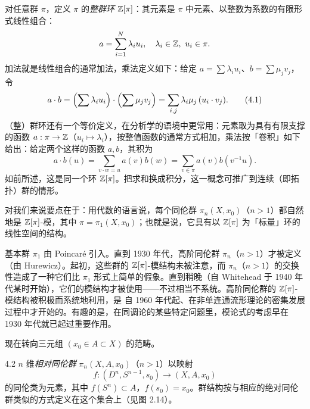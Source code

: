 对任意群 $\pi$，定义 $\pi$ 的\emph{整群环} $\mathbb{Z}[\pi]$：其元素是 $\pi$ 中元素、以整数为系数的有限形式线性组合：
\[
  a=\sum_{i=1}^N\lambda_i u_i,\quad \lambda_i\in\mathbb{Z},\ u_i\in\pi.
\]
加法就是线性组合的通常加法，乘法定义如下：给定 $a=\sum\lambda_i u_i$、$b=\sum\mu_j v_j$，令
\begin{equation}
  a\cdot b=\Bigl(\sum\lambda_i u_i\Bigr)\cdot\Bigl(\sum\mu_j v_j\Bigr)
  =\sum_{i,j}\lambda_i\mu_j\,(u_i\cdot v_j). \tag{4.1}
\end{equation}
（整）群环还有一个等价定义，在分析学的语境中更常用：元素取为具有有限支撑的函数 $a:\pi\to\mathbb{Z}$（$u_i\mapsto\lambda_i$），按整值函数的通常方式相加，乘法按「卷积」如下给出：给定两个这样的函数 $a,b$，其积为
\begin{equation}
  a\cdot b(u)=\sum_{v\cdot w=u}a(v)b(w)=\sum_{v\in\pi}a(v)b(v^{-1}u). \tag{4.2}
\end{equation}
如前所述，这是同一个环 $\mathbb{Z}[\pi]$。把求和换成积分，这一概念可推广到连续（即拓扑）群的情形。

对我们来说要点在于：用代数的语言说，每个同伦群 $\pi_n(X,x_0)$（$n>1$）都自然地是 $\mathbb{Z}[\pi]$-模，其中 $\pi=\pi_1(X,x_0)$；也就是说，它具有以 $\mathbb{Z}[\pi]$ 为「标量」环的线性空间的结构。

基本群 $\pi_1$ 由 Poincaré 引入。直到 1930 年代，高阶同伦群 $\pi_n$（$n>1$）才被定义（由 Hurewicz）。起初，这些群的 $\mathbb{Z}[\pi]$-模结构未被注意，而 $\pi_n$（$n>1$）的交换性造成了一种它们比 $\pi_1$ 形式上简单的假象。直到稍晚（自 Whitehead 于 1940 年代某时开始），它们的模结构才被使用——不过相当不系统。高阶同伦群的 $\mathbb{Z}[\pi]$-模结构被积极而系统地利用，是
自 1960 年代起、在非单连通流形理论的密集发展过程中才开始的。有趣的是，在同调论的某些特定问题里，模论式的考虑早在 1930 年代就已起过重要作用。

现在转向三元组 $(x_0\in A\subset X)$ 的范畴。

\begin{definition*}{4.2}
$n$ 维\emph{相对同伦群} $\pi_n(X,A,x_0)$（$n>1$）以映射
\[
  f:(D^n,S^{n-1},s_0)\to(X,A,x_0)
\]
的同伦类为元素，其中 $f(S^n)\subset A$，$f(s_0)=x_0$。群结构按与相应的绝对同伦群类似的方式定义在这个集合上（见图 2.14）。
\end{definition*}

